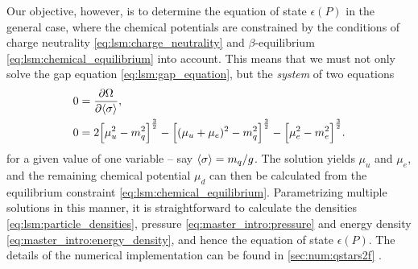 Our objective, however, is to determine the equation of state $\epsilon(P)$ in the general case,
where the chemical potentials are constrained by the conditions of charge neutrality \eqref{eq:lsm:charge_neutrality} and $\beta$-equilibrium \eqref{eq:lsm:chemical_equilibrium} into account.
This means that we must not only solve the gap equation  \eqref{eq:lsm:gap_equation},
but the \emph{system} of two equations
\begin{subequations}
\begin{align}
	0 &= \pdv{\Omega}{ \langle \sigma \rangle} , \label{eq:lsm:minsys_min} \\
	0 &= 2 \Big[\mu_u^2-m_q^2\Big]^\frac32 - \Big[(\mu_u+\mu_e)^2-m_q^2\Big]^\frac32 - \Big[\mu_e^2-m_e^2\Big]^\frac32 \label{eq:lsm:minsys_charge}.
\end{align}%
\label{eq:lsm:minsys}%
\end{subequations}%
for a given value of one variable -- say $\langle \sigma \rangle = m_q/g$.
The solution yields $\mu_u$ and $\mu_e$, and the remaining chemical potential $\mu_d$ can then be calculated from the equilibrium constraint \eqref{eq:lsm:chemical_equilibrium}.
Parametrizing multiple solutions in this manner, it is straightforward to calculate the densities \eqref{eq:lsm:particle_densities}, pressure \eqref{eq:master_intro:pressure} and energy density \eqref{eq:master_intro:energy_density},
and hence the equation of state $\epsilon(P)$.
The details of the numerical implementation can be found in \cref{sec:num:qstars2f} .

